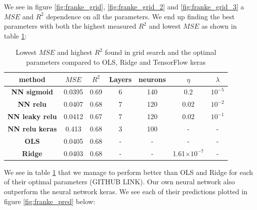 \documentclass[11pt]{article}
\begin{document}
We see in figure \ref{fig:franke_grid}, \ref{fig:franke_grid_2} and \ref{fig:franke_grid_3} a $MSE$ and $R^2$ dependence on all the parameters. We end up finding the best parameters with both the highest measured $R^2$ and lowest $MSE$ as shown in table \ref{tab:franke_best}:
\begin{table}[H]
    \centering
    \caption{Lowest $MSE$ and highest $R^2$ found in grid search and the optimal parameters compared to OLS, Ridge and TensorFlow keras}
    \label{tab:franke_best}
    \begin{tabular}{|c|c|c|c|c|c|c|}
        \hline
        method                 & $MSE$  & $R^2$ & Layers & neurons & $\eta$                & $\lambda$ \\
        \hline
        \textbf{NN sigmoid}    & 0.0395 & 0.69  & 6      & 140     & 0.2                   & $10^{-5}$ \\\hline
        \textbf{NN relu}       & 0.0407 & 0.68  & 7      & 120     & 0.02                  & $10^{-2}$ \\\hline
        \textbf{NN leaky relu} & 0.0412 & 0.67  & 7      & 120     & 0.02                  & $10^{-1}$ \\\hline
        \textbf{NN relu keras} & 0.413  & 0.68  & 3      & 100     & -                     & -         \\\hline
        \textbf{OLS}           & 0.0405 & 0.68  & -      & -       & -                     & -         \\\hline
        \textbf{Ridge}         & 0.0403 & 0.68  & -      & -       & 1.61$\times 10 ^{-7}$ & -         \\
        \hline
    \end{tabular}
\end{table}
We see in table \ref{tab:franke_best} that we manage to perform better than OLS and Ridge for each of their optimal parameters (GITHUB LINK). Our own neural network also outperform the neural network keras. We see each of their predictions plotted in figure \ref{fig:franke_pred} below:
\end{document}
